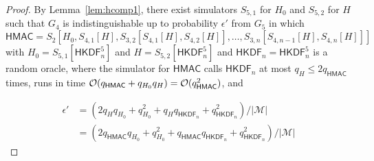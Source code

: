 \documentclass[compsoc, conference, letterpaper, 10pt, times]{IEEEtran}
\newif\ifapproxproba
\newcommand{\HKDF}{\mathsf{HKDF}}
\newcommand{\hmac}{\mathsf{HMAC}}
\newcommand{\Smac}{\mathcal{M}}
\newcommand{\ab}{\allowbreak}
\begin{document}
\begin{proof}
By Lemma~\ref{lem:hcomp1}, there exist simulators $S_{5,1}$ for $H_0$
and $S_{5,2}$ for $H$ such that
$G_4$ is indistinguishable up to probability $\epsilon'$
from $G_5$ in which
$\hmac = S_2[H_0, \ab S_{4,1}[H], \ab S_{3,2}[S_{4,1}[H], S_{4,2}[H]], \ab \dots, \ab S_{3,n}[S_{4,n-1}[H], S_{4,n}[H]]]$ with $H_0 = S_{5,1}[\HKDF^5_n]$ and $H = S_{5,2}[\HKDF^5_n]$
and $\HKDF_n = \HKDF^5_n$  is a random oracle, where
the simulator for $\hmac$ calls $\HKDF_n$ at most $q_H \leq 2 q_{\hmac}$ times,
runs in time ${\cal O}(q_{\hmac} + q_{H_0} q_H) = {\cal O}(q_{\hmac}^2)$,
and
\ifapproxproba
\begin{align*}
\epsilon' &= {\cal O}((q_H q_{H_0} + q_{H_0}^2 + q_H q_{\HKDF_n} + q_{\HKDF_n}^2)/|\Smac|)\\
& = {\cal O}((q_{\hmac}^2 + q_{\hmac}q_{\HKDF_n} + q_{\HKDF_n}^2)/|\Smac|) \\
&= {\cal O}((q_{\hmac} + q_{\HKDF_n})^2)/|\Smac|)\,.
\end{align*}
\else
\begin{align*}
\epsilon' &= (2q_H q_{H_0} + q_{H_0}^2 + q_H q_{\HKDF_n} + q_{\HKDF_n}^2)/|\Smac|\\
& = (2q_{\hmac}q_{H_0} + q_{H_0}^2 + q_{\hmac}q_{\HKDF_n} + q_{\HKDF_n}^2)/|\Smac| 
\end{align*}
\fi


\end{proof}
\end{document}

